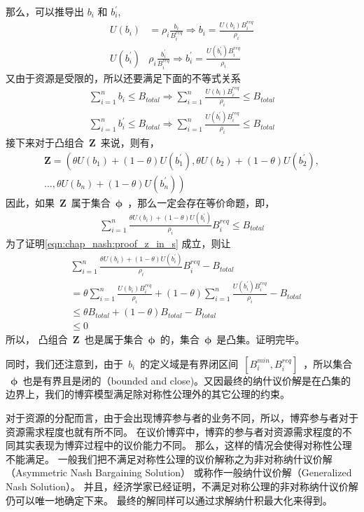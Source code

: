 那么，可以推导出 $b_i$ 和 $ b_i^\prime$,
\begin{align*}
    U(b_i) &= \rho_i \frac{b_i}{B_i^{req}} \Rightarrow b_i = \frac{U(b_i)B_i^{req}}{\rho_i} \\
    U(b_i^\prime) & \rho_i \frac{b_i^\prime} {B_i^{req}} \Rightarrow b_i^\prime = \frac{U(b_i^\prime) B_i^{req}}{\rho_i}
\end{align*}
又由于资源是受限的，所以还要满足下面的不等式关系
\begin{align*}
    \sum_{i=1}^n b_i \le B_{total} \Rightarrow \sum_{i=1}^n \frac{U(b_i)B_i^{req}}{\rho_i} \le B_{total}\\
    \sum_{i=1}^n b_i^\prime \le B_{total}\Rightarrow \sum_{i=1}^n \frac{U(b_i^\prime)B_i^{req}}{\rho_i} \le B_{total}
\end{align*}
接下来对于凸组合~$\mathbf{Z}$~来说，则有，
\begin{align*}
    \mathbf{Z} = \left( \theta U(b_1) + (1-\theta) U(b_1^\prime),    \theta U(b_2) + (1-\theta) U(b_2^\prime), \right. \\
    \ldots,  \left. \theta U(b_n) + (1-\theta) U(b_n^\prime) \right)
\end{align*}
因此，如果~$\mathbf{Z}$~属于集合~$\mathbf{\phi}$~，那么一定会存在等价命题，即，
\begin{align}
    \sum_{i=1}^{n} \frac{ \theta U(b_i) + (1-\theta) U(b_i^\prime)}{\rho_i} B_i^{req} \le B_{total}
    \label{eqn:chap_nash:proof_z_in_s}
\end{align}
为了证明\eqref{eqn:chap_nash:proof_z_in_s} 成立，则让
\begin{align*}
    &\sum_{i=1}^{n} \frac{ \theta U(b_i) + (1-\theta) U(b_i^\prime)}{\rho_i} B_i^{req} - B_{total} \\
    &= \theta \sum_{i=1}^n \frac{U(b_i)B_i^{req}}{\rho_i} + (1-\theta) \sum_{i=1}^n \frac{U(b_i^\prime)B_i^{req}}{\rho_i} -B_{total} \\
    &\le \theta B_{total} + (1-\theta)B_{total} - B_{total}\\
    & \le 0
\end{align*}
所以，
凸组合~$\mathbf{Z}$~也是属于集合~$\mathbf{\phi}$~的，集合~$\mathbf{\phi}$~是凸集。证明完毕。

同时，我们还注意到，由于~$b_i$~的定义域是有界闭区间~$[B_i^{min},B_i^{req}]$~，所以集合
~$\mathbf{\phi}$~也是有界且是闭的（bounded and close)。又因最终的纳什议价解是在凸集的边界上，我们的博弈模型满足除对称性公理外的其它公理的约束。

对于资源的分配而言，由于会出现博弈参与者的业务不同，所以，博弈参与者对于资源需求程度也就有所不同。
在议价博弈中，博弈的参与者对资源需求程度的不同其实表现为博弈过程中的议价能力不同。
那么，这样的情况会使得对称性公理不能满足。
一般我们把不满足对称性公理的议价解称之为非对称纳什议价解（Asymmetric Nash Bargaining Solution）
或称作一般纳什议价解（Generalized  Nash  Solution）。
并且，经济学家已经证明，不满足对称公理的非对称纳什议价解仍可以唯一地确定下来\cite{Osborne_Rubinstein_1994}。
最终的解同样可以通过求解纳什积最大化来得到。

